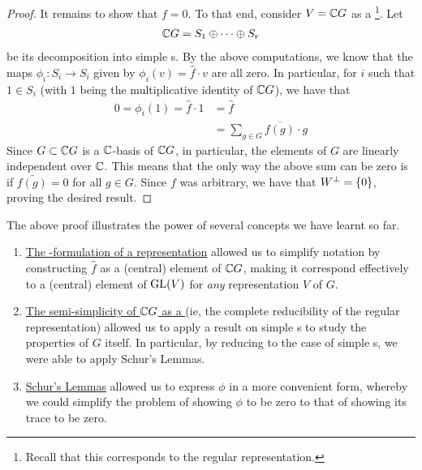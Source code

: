 \begin{proof}
    It remains to show that $f = 0$. To that end, consider $V = \mathbb{C} G$ as a \CGM\footnote{Recall that this corresponds to the regular representation.}. Let
    \begin{align*}
        \mathbb{C} G = S_1 \oplus \cdots \oplus S_r
    \end{align*}
    be its decomposition into simple \CGM s. By the above computations, we know that the maps $\phi_i : S_i \to S_i$ given by $\phi_i(v) = \hat{f} \cdot v$ are all zero. In particular, for $i$ such that $1 \in S_i$ (with $1$ being the multiplicative identity of $\mathbb{C} G$), we have that
    \begin{align*}
        0 = \phi_i(1) = \hat{f} \cdot 1 &= \hat{f} \\
        &= \sum_{g \in G} \overline{f(g)} \cdot g
    \end{align*}
    Since $G \subset \mathbb{C} G$ is a $\mathbb{C}$-basis of $\mathbb{C} G$, in particular, the elements of $G$ are linearly independent over $\mathbb{C}$. This means that the only way the above sum can be zero is if $\bar{f(g)} = 0$ for all $g \in G$. Since $f$ was arbitrary, we have that $W^\perp = \left\{ 0 \right\}$, proving the desired result.
\end{proof}

\begin{remark}
    The above proof illustrates the power of several concepts we have learnt so far.
    \begin{enumerate}
        \item \underline{The \CGM-formulation of a representation} allowed us to simplify notation by constructing $\hat{f}$ as a (central) element of $\mathbb{C} G$, making it correspond effectively to a (central) element of $\operatorname{GL}\!\left( V \right)$ for \textit{any} representation $V$ of $G$.
        \item \underline{The semi-simplicity of $\mathbb{C} G$ as a \CGM} (ie, the complete reducibility of the regular representation) allowed us to apply a result on simple \CGM s to study the properties of $G$ itself. In particular, by reducing to the case of simple \CGM s, we were able to apply Schur's Lemmas.
        \item \underline{Schur's Lemmas} allowed us to express $\phi$ in a more convenient form, whereby we could simplify the problem of showing $\phi$ to be zero to that of showing its trace to be zero.
    \end{enumerate}
\end{remark}